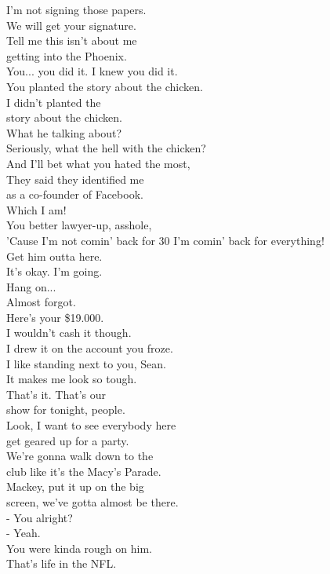 \documentclass{article}
\begin{document}
\begin{multicols}{3}
I'm not signing those papers.\\
We will get your signature.\\
Tell me this isn't about me\\
getting into the Phoenix.\\
You... you did it. I knew you did it.\\
You planted the story about the chicken.\\
I didn't planted the\\
story about the chicken.\\
What he talking about?\\
Seriously, what the hell with the chicken?\\
And I'll bet what you hated the most,\\
They said they identified me\\
as a co-founder of Facebook.\\
Which I am!\\
You better lawyer-up, asshole,\\
'Cause I'm not comin' back for 30%
I'm comin' back for everything!\\
Get him outta here.\\
It's okay. I'm going.\\
Hang on...\\
Almost forgot.\\
Here's your \$19.000.\\
I wouldn't cash it though.\\
I drew it on the account you froze.\\
I like standing next to you, Sean.\\
It makes me look so tough.\\
That's it. That's our\\
show for tonight, people.\\
Look, I want to see everybody here\\
get geared up for a party.\\
We're gonna walk down to the\\
club like it's the Macy's Parade.\\
Mackey, put it up on the big\\
screen, we've gotta almost be there.\\
- You alright?\\
- Yeah.\\
You were kinda rough on him.\\
That's life in the NFL.\\

\end{multicols}
\end{document}
